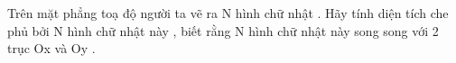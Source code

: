 Trên mặt phẳng toạ độ người ta vẽ ra N hình chữ nhật . Hãy tính diện tích che phủ bởi N hình chữ nhật này , biết rằng N hình chữ nhật này song song với 2 trục Ox và Oy .
